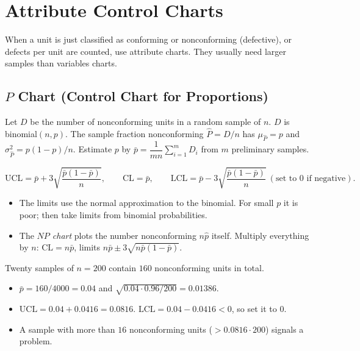 \section{Attribute Control Charts}

When a unit is just classified as conforming or nonconforming (defective), or defects per unit are counted, use attribute charts. They usually need larger samples than variables charts.

\subsection{$P$ Chart (Control Chart for Proportions)}

Let $D$ be the number of nonconforming units in a random sample of $n$. $D$ is binomial$(n,p)$. The sample fraction nonconforming $\hat{P}=D/n$ has $\mu_{\hat{P}}=p$ and $\sigma^2_{\hat{P}}=p(1-p)/n$. Estimate $p$ by $\bar{p}=\dfrac1{mn}\sum_{i=1}^mD_i$ from $m$ preliminary samples.

\begin{theorem}[$P$ chart]\label{thm:pchart}
\[ \mathrm{UCL}=\bar{p}+3\sqrt{\frac{\bar{p}(1-\bar{p})}n},\qquad\mathrm{CL}=\bar{p},\qquad\mathrm{LCL}=\bar{p}-3\sqrt{\frac{\bar{p}(1-\bar{p})}n}\ (\text{set to }0\text{ if negative}). \]
\end{theorem}

\begin{itemize}
  \item The limits use the normal approximation to the binomial. For small $p$ it is poor; then take limits from binomial probabilities.
  \item The \emph{$NP$ chart} plots the number nonconforming $n\hat{p}$ itself. Multiply everything by $n$: $\mathrm{CL}=n\bar{p}$, limits $n\bar{p}\pm3\sqrt{n\bar{p}(1-\bar{p})}$.
\end{itemize}

\begin{example}
Twenty samples of $n=200$ contain $160$ nonconforming units in total.
\begin{itemize}
  \item $\bar{p}=160/4000=0.04$ and $\sqrt{0.04\cdot0.96/200}=0.01386$.
  \item $\mathrm{UCL}=0.04+0.0416=0.0816$. $\mathrm{LCL}=0.04-0.0416<0$, so set it to $0$.
  \item A sample with more than $16$ nonconforming units ($>0.0816\cdot200$) signals a problem.
\end{itemize}
\end{example}

